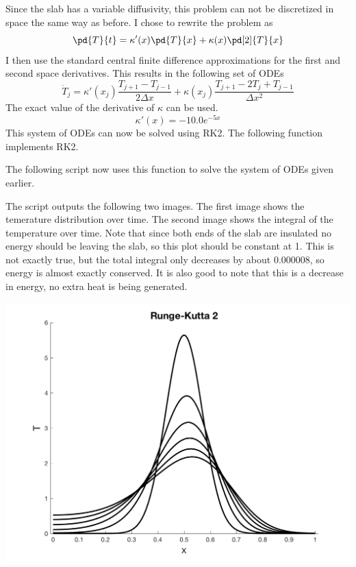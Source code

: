 \documentclass[11pt, oneside]{article}
\begin{document}
\begin{enumerate}
    Since the slab has a variable diffusivity, this problem can not be
    discretized in space the same way as before.
    I chose to rewrite the problem as
    \[
      \pd{T}{t} = \kappa'(x) \pd{T}{x} + \kappa(x) \pd[2]{T}{x}
    \]
    I then use the standard central finite difference approximations for the
    first and second space derivatives.
    This results in the following set of ODEs
    \[
      \dot{T}_j = \kappa'(x_j) \frac{T_{j+1} - T_{j-1}}{2\Delta x} + \kappa(x_j) \frac{T_{j+1} - 2T_j + T_{j-1}}{\Delta x^2}
    \]
    The exact value of the derivative of $\kappa$ can be used.
    \[
      \kappa'(x) = -10.0 e^{-5x}
    \]
    This system of ODEs can now be solved using RK2.
    The following function implements RK2.
    
    The following script now uses this function to solve the system of ODEs
    given earlier.
    
    The script outputs the following two images.
    The first image shows the temerature distribution over time.
    The second image shows the integral of the temperature over time.
    Note that since both ends of the slab are insulated no energy should be
    leaving the slab, so this plot should be constant at 1.
    This is not exactly true, but the total integral only decreases by about
    $0.000008$, so energy is almost exactly conserved.
    It is also good to note that this is a decrease in energy, no extra heat is
    being generated.
    \begin{center}
      \includegraphics[scale=0.5]{Figures/03_03.png}

\end{center}
\end{enumerate}
\end{document}
